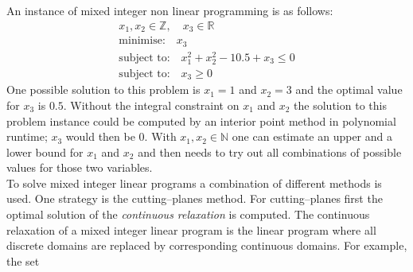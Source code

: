 % 
% 
An instance of mixed integer non linear programming is as follows:
\begin{eqnarray}
x_1,x_2\in \mathbb{Z},\quad x_3\in \mathbb{R}\\
\text{minimise:}\quad x_3 \\
\text{subject to:}\quad x_1^2 + x_2^2 - 10.5 + x_3 \leq 0 \\
\text{subject to:}\quad x_3 \geq 0
\end{eqnarray}
One possible solution to this problem is $x_1=1$ and $x_2=3$ and the optimal value for $x_3$ is $0.5$. Without the integral constraint on $x_1$ and $x_2$ the solution to this problem instance could be computed by an interior point method in polynomial runtime; $x_3$ would then be $0$. With $x_1,x_2\in \mathbb{N}$ one can estimate an upper and a lower bound for $x_1$ and $x_2$ and then needs to try out all combinations of possible values for those two variables.\\
To solve mixed integer linear programs a combination of different methods is used. One strategy is the cutting--planes method. For cutting--planes first the optimal solution of the \emph{continuous relaxation} is computed. The continuous relaxation of a mixed integer linear program is the linear program where all discrete domains are replaced by corresponding continuous domains. For example, the set 
